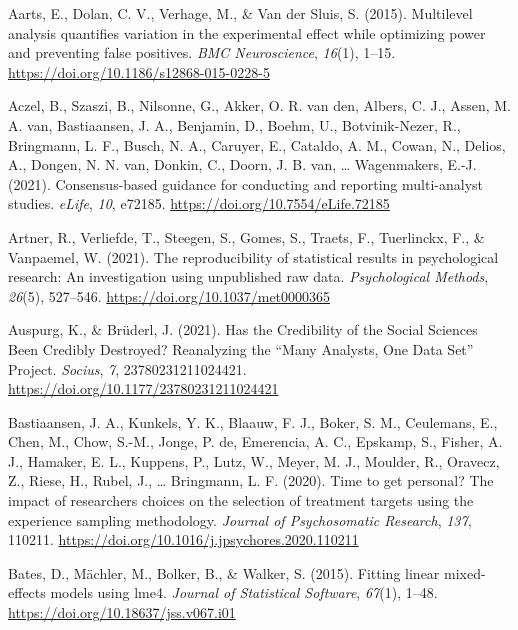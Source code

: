 \documentclass[
  letterpaper,
  DIV=11,
  numbers=noendperiod]{scrreprt}
\newlength{\cslhangindent}
\newlength{\cslentryspacingunit} %
\newenvironment{CSLReferences}[2] %
 {%
  \setlength{\parindent}{0pt}
  \ifodd #1
  \let\oldpar\par
  \def\par{\hangindent=\cslhangindent\oldpar}
  \fi
  \setlength{\parskip}{#2\cslentryspacingunit}
 }%
 {}
\begin{document}
\hypertarget{refs}{}
\begin{CSLReferences}{1}{0}
\leavevmode{}%
Aarts, E., Dolan, C. V., Verhage, M., \& Van der Sluis, S. (2015).
Multilevel analysis quantifies variation in the experimental effect
while optimizing power and preventing false positives. \emph{BMC
Neuroscience}, \emph{16}(1), 1--15.
\url{https://doi.org/10.1186/s12868-015-0228-5}

\leavevmode{}%
Aczel, B., Szaszi, B., Nilsonne, G., Akker, O. R. van den, Albers, C.
J., Assen, M. A. van, Bastiaansen, J. A., Benjamin, D., Boehm, U.,
Botvinik-Nezer, R., Bringmann, L. F., Busch, N. A., Caruyer, E.,
Cataldo, A. M., Cowan, N., Delios, A., Dongen, N. N. van, Donkin, C.,
Doorn, J. B. van, \ldots{} Wagenmakers, E.-J. (2021). Consensus-based
guidance for conducting and reporting multi-analyst studies.
\emph{eLife}, \emph{10}, e72185.
\url{https://doi.org/10.7554/eLife.72185}

\leavevmode{}%
Artner, R., Verliefde, T., Steegen, S., Gomes, S., Traets, F.,
Tuerlinckx, F., \& Vanpaemel, W. (2021). The reproducibility of
statistical results in psychological research: An investigation using
unpublished raw data. \emph{Psychological Methods}, \emph{26}(5),
527--546. \url{https://doi.org/10.1037/met0000365}

\leavevmode{}%
Auspurg, K., \& Brüderl, J. (2021). Has the Credibility of the Social
Sciences Been Credibly Destroyed? Reanalyzing the {``}Many Analysts, One
Data Set{''} Project. \emph{Socius}, \emph{7}, 23780231211024421.
\url{https://doi.org/10.1177/23780231211024421}

\leavevmode{}%
Bastiaansen, J. A., Kunkels, Y. K., Blaauw, F. J., Boker, S. M.,
Ceulemans, E., Chen, M., Chow, S.-M., Jonge, P. de, Emerencia, A. C.,
Epskamp, S., Fisher, A. J., Hamaker, E. L., Kuppens, P., Lutz, W.,
Meyer, M. J., Moulder, R., Oravecz, Z., Riese, H., Rubel, J., \ldots{}
Bringmann, L. F. (2020). Time to get personal? The impact of researchers
choices on the selection of treatment targets using the experience
sampling methodology. \emph{Journal of Psychosomatic Research},
\emph{137}, 110211.
\url{https://doi.org/10.1016/j.jpsychores.2020.110211}

\leavevmode{}%
Bates, D., Mächler, M., Bolker, B., \& Walker, S. (2015). Fitting linear
mixed-effects models using {\textbraceleft}lme4{\textbraceright}.
\emph{Journal of Statistical Software}, \emph{67}(1), 1--48.
\url{https://doi.org/10.18637/jss.v067.i01}


\end{CSLReferences}
\end{document}
